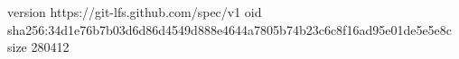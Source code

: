 version https://git-lfs.github.com/spec/v1
oid sha256:34d1e76b7b03d6d86d4549d888e4644a7805b74b23c6c8f16ad95e01de5e5e8c
size 280412
